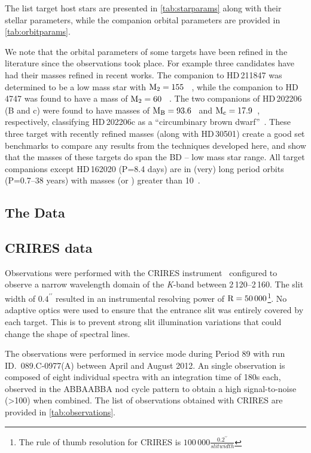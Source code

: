 The list target host stars are presented in \cref{tab:starparams} along with their stellar parameters, while the companion orbital parameters are provided in \cref{tab:orbitparams}.

We note that the orbital parameters of some targets have been refined in the literature since the observations took place.
For example three candidates have had their masses refined in recent works.
The companion to {HD\,211847} was determined to be a low mass star with \(\rm M_2=155~\)\Mjup{}~\citep{moutou_eccentricity_2017}, while the companion to {HD\,4747} was found to have a mass of \(\rm M_2=60~\)\Mjup{}~\citep{crepp_trends_2016}.
The two companions of {HD\,202206} (B and c) were found to have masses of \(\rm M_B =93.6\)~\Mjup{} and \(\rm M_c = 17.9\)~\Mjup{}, respectively, classifying {HD\,202206}c as a ``circumbinary brown dwarf''~\citep{benedict_hd_2017}.
These three target with recently refined masses (along with {HD\,30501}) create a good set benchmarks to compare any results from the techniques developed here, and show that the masses of these targets do span the BD -- low mass star range.
All target companions except {HD\,162020} (P=8.4 days) are in (very) long period orbits (P=0.7--38 years) with masses (or \mtwosini{}) greater than 10~\Mjup{}.




\subsection{The Data}

\subsection{CRIRES data}
\label{subsec:CRIRES}
Observations were performed with the {CRIRES} instrument~\citep{kaeufl_crires_2004} configured to observe a narrow wavelength domain of the \emph{K}-band between 2\,120--2\,160\nm{}.
The slit width of \(0.4^{\prime\prime}\) resulted in an instrumental resolving power of \(\textrm{R}=50\,000\)\footnote{The rule of thumb resolution for {CRIRES} is \(100\,000\frac{0.2^{\prime\prime}}{slit width}\)}.
No adaptive optics were used to ensure that the entrance slit was entirely covered by each target.
This is to prevent strong slit illumination variations that could change the shape of spectral lines.

The observations were performed in service mode during Period 89 with run {ID.~089.C-0977(A)} between April and August 2012.
An single observation is composed of eight individual spectra with an integration time of 180\si{\second} each, observed in the {ABBAABBA} nod cycle pattern to obtain a high signal-to-noise (>100) when combined.
The list of observations obtained with {CRIRES} are provided in \cref{tab:observations}.

